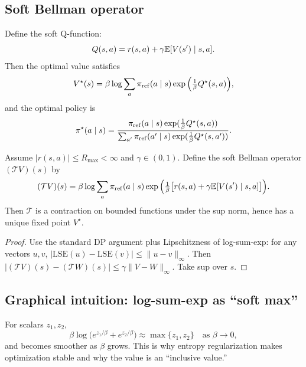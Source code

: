\subsection{Soft Bellman operator}
Define the soft Q-function:
\[
Q(s,a)= r(s,a) + \gamma \mathbb{E}[V(s')\mid s,a].
\]
Then the optimal value satisfies
\begin{equation}\label{eq:softV}
V^\star(s)
=
\beta\log\sum_{a}\pi_{\mathrm{ref}}(a\mid s)\exp\Big(\tfrac{1}{\beta}Q^\star(s,a)\Big),
\end{equation}
and the optimal policy is
\begin{equation}\label{eq:softpi}
\pi^\star(a\mid s)
=
\frac{\pi_{\mathrm{ref}}(a\mid s)\exp(\tfrac{1}{\beta}Q^\star(s,a))}{\sum_{a'}\pi_{\mathrm{ref}}(a'\mid s)\exp(\tfrac{1}{\beta}Q^\star(s,a'))}.
\end{equation}

\begin{theorem}\label{thm:contraction}
Assume $|r(s,a)|\le R_{\max}<\infty$ and $\gamma\in(0,1)$. Define the soft Bellman operator $(\mathcal{T}V)(s)$ by
\[
(\mathcal{T}V)(s)
=
\beta\log\sum_{a}\pi_{\mathrm{ref}}(a\mid s)\exp\Big(\tfrac{1}{\beta}\big[r(s,a)+\gamma \mathbb{E}[V(s')\mid s,a]\big]\Big).
\]
Then $\mathcal{T}$ is a contraction on bounded functions under the sup norm, hence has a unique fixed point $V^\star$.
\end{theorem}
\begin{proof}
Use the standard DP argument plus Lipschitzness of log-sum-exp: for any vectors $u,v$, $|\mathrm{LSE}(u)-\mathrm{LSE}(v)|\le \|u-v\|_\infty$.
Then $|(\mathcal{T}V)(s)-(\mathcal{T}W)(s)|\le \gamma\|V-W\|_\infty$. Take sup over $s$.
\end{proof}

\subsection{Graphical intuition: log-sum-exp as ``soft max''}
For scalars $z_1,z_2$,
\[
\beta\log\big(e^{z_1/\beta}+e^{z_2/\beta}\big)
\approx \max\{z_1,z_2\} \quad\text{as }\beta\to 0,
\]
and becomes smoother as $\beta$ grows. This is why entropy regularization makes optimization stable and why the value is an ``inclusive value.''

\begin{center}
\end{center}

